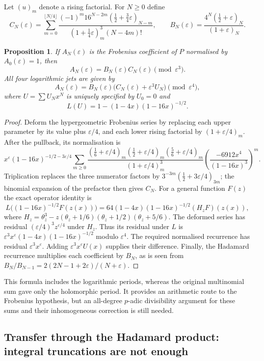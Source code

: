 \documentclass[11pt]{amsart}
\newtheorem{proposition}[theorem]{Proposition}
\theoremstyle{definition}
\theoremstyle{remark}
\begin{document}
Let $(u)_m$ denote a rising factorial. For $N\ge0$ define
\[
C_N(\varepsilon)=\sum_{m=0}^{\lfloor N/4\rfloor}
\frac{(-1)^m16^{N-2m}(\tfrac12+\tfrac34\varepsilon)_{N-m}}
     {(1+\tfrac14\varepsilon)_m^3(N-4m)!},\qquad
B_N(\varepsilon)=\frac{4^N(\tfrac12+\varepsilon)_N}{(1+\varepsilon)_N}.
\]
\begin{proposition}\label{prop:deformed-sum}
If $A_N(\varepsilon)$ is the Frobenius coefficient of $P$ normalised by
$A_0(\varepsilon)=1$, then
\[
A_N(\varepsilon)=B_N(\varepsilon)C_N(\varepsilon)\pmod{\varepsilon^3}.
\]
All four logarithmic jets are given by
\[
A_N(\varepsilon)=B_N(\varepsilon)
\bigl(C_N(\varepsilon)+\varepsilon^3U_N\bigr)\pmod{\varepsilon^4},
\]
where $U=\sum U_Nx^N$ is uniquely specified by $U_0=0$ and
\[
L(U)=1-(1-4x)(1-16x)^{-1/2}.
\]
\end{proposition}
\begin{proof}
Deform the hypergeometric Frobenius series by replacing each upper parameter
by its value plus $\varepsilon/4$, and each lower rising factorial by
$(1+\varepsilon/4)_m$. After the pullback, its normalisation is
\[
x^\varepsilon(1-16x)^{-1/2-3\varepsilon/4}
\sum_{m\ge0}\frac{(\tfrac16+\varepsilon/4)_m
(\tfrac12+\varepsilon/4)_m(\tfrac56+\varepsilon/4)_m}
{(1+\varepsilon/4)_m^3}
\left(\frac{-6912x^4}{(1-16x)^3}\right)^m.
\]
Triplication replaces the three numerator factors by
$3^{-3m}(\tfrac12+3\varepsilon/4)_{3m}$; the binomial expansion of the
prefactor then gives $C_N$.
For a general function $F(z)$ the exact operator identity is
\[
L\bigl((1-16x)^{-1/2}F(z(x))\bigr)
=64(1-4x)(1-16x)^{-1/2}(H_zF)(z(x)),
\]
where $H_z=\theta_z^3-z(\theta_z+1/6)(\theta_z+1/2)(\theta_z+5/6)$.
The deformed series has residual $(\varepsilon/4)^3z^{\varepsilon/4}$ under
$H_z$. Thus its residual under $L$ is
$\varepsilon^3x^\varepsilon(1-4x)(1-16x)^{-1/2}$ modulo $\varepsilon^4$.
The required normalised recurrence has residual $\varepsilon^3x^\varepsilon$.
Adding $\varepsilon^3x^\varepsilon U(x)$ supplies their difference.
Finally, the Hadamard recurrence multiplies each coefficient by $B_N$,
as is seen from $B_N/B_{N-1}=2(2N-1+2\varepsilon)/(N+\varepsilon)$.
\end{proof}

This formula includes the logarithmic periods, whereas the original multinomial
sum gave only the holomorphic period. It provides an arithmetic route to the
Frobenius hypothesis, but an all-degree $p$-adic divisibility argument for these
sums and their inhomogeneous correction is still needed.

\subsection{Transfer through the Hadamard product: integral truncations are not enough}
\end{document}
